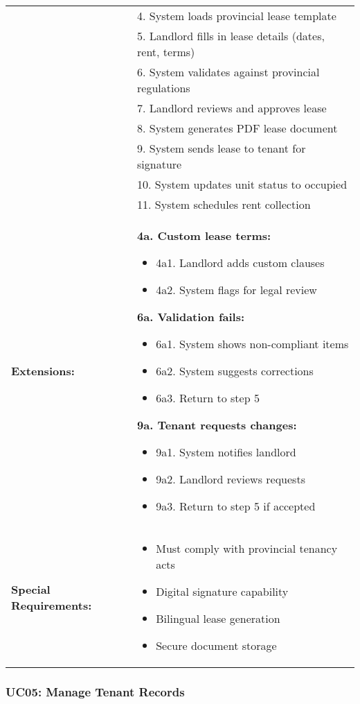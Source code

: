 \documentclass[12pt]{article}
\begin{document}
\begin{tabular}{|p{3cm}|p{11cm}|}
& 4. System loads provincial lease template \\
& 5. Landlord fills in lease details (dates, rent, terms) \\
& 6. System validates against provincial regulations \\
& 7. Landlord reviews and approves lease \\
& 8. System generates PDF lease document \\
& 9. System sends lease to tenant for signature \\
& 10. System updates unit status to occupied \\
& 11. System schedules rent collection \\
\hline
\textbf{Extensions:} & 
\textbf{4a. Custom lease terms:}
\begin{itemize}
    \item 4a1. Landlord adds custom clauses
    \item 4a2. System flags for legal review
\end{itemize}
\textbf{6a. Validation fails:}
\begin{itemize}
    \item 6a1. System shows non-compliant items
    \item 6a2. System suggests corrections
    \item 6a3. Return to step 5
\end{itemize}
\textbf{9a. Tenant requests changes:}
\begin{itemize}
    \item 9a1. System notifies landlord
    \item 9a2. Landlord reviews requests
    \item 9a3. Return to step 5 if accepted
\end{itemize} \\
\hline
\textbf{Special Requirements:} & 
\begin{itemize}
    \item Must comply with provincial tenancy acts
    \item Digital signature capability
    \item Bilingual lease generation
    \item Secure document storage
\end{itemize} \\
\hline
\end{tabular}

\subsubsection{UC05: Manage Tenant Records}
\end{document}
